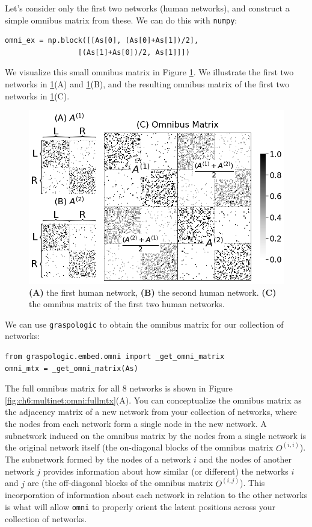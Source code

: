 Let's consider only the first two networks (human networks), and construct a simple omnibus matrix from these. We can do this with \texttt{numpy}:

\begin{lstlisting}[style=python]
omni_ex = np.block([[As[0], (As[0]+As[1])/2],
                 [(As[1]+As[0])/2, As[1]]])
\end{lstlisting}

We visualize this small omnibus matrix in Figure \ref{fig:ch6:multinet:omni:ex}. We illustrate the first two networks in \ref{fig:ch6:multinet:omni:ex}(A) and \ref{fig:ch6:multinet:omni:ex}(B), and the resulting omnibus matrix of the first two networks in \ref{fig:ch6:multinet:omni:ex}(C).

\begin{figure}[h]
    \centering
    \includegraphics[width=\linewidth]{representations/ch6/Images/omni_ex.png}
    \caption[simple example of omnibus matrix]{\textbf{(A)} the first human network, \textbf{(B)} the second human network. \textbf{(C)} the omnibus matrix of the first two human networks.}
    \label{fig:ch6:multinet:omni:ex}
\end{figure}

We can use \texttt{graspologic} to obtain the omnibus matrix for our collection of networks:
\begin{lstlisting}[style=python]
from graspologic.embed.omni import _get_omni_matrix
omni_mtx = _get_omni_matrix(As)
\end{lstlisting}

The full omnibus matrix for all $8$ networks is shown in Figure \ref{fig:ch6:multinet:omni:fullmtx}(A). You can conceptualize the omnibus matrix as the adjacency matrix of a new network from your collection of networks, where the nodes from each network form a single node in the new network. A subnetwork induced on the omnibus matrix by the nodes from a single network is the original network itself (the on-diagonal blocks of the omnibus matrix $O^{(i,i)}$). The subnetwork formed by the nodes of a network $i$ and the nodes of another network $j$ provides information about how similar (or different) the networks $i$ and $j$ are (the off-diagonal blocks of the omnibus matrix $O^{(i, j)}$). This incorporation of information about each network in relation to the other networks is what will allow \texttt{omni} to properly orient the latent positions across your collection of networks.

